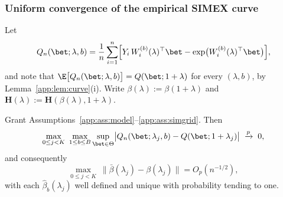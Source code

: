 \subsubsection{Uniform convergence of the empirical SIMEX curve}\label{app:sec:curve}

Let
\[
  Q_n(\bet;\lambda,b)=\frac1n\sum_{i=1}^n
  \Bigl[Y_i\,W_i^{(b)}(\lambda)^\top\bet
  -\exp\bigl(W_i^{(b)}(\lambda)^\top\bet\bigr)\Bigr],
\]
and note that
$\E\bigl[Q_n(\bet;\lambda,b)\bigr]=Q(\bet;1+\lambda)$ for every
$(\lambda,b)$, by Lemma~\ref{app:lem:curve}(i). Write
$\beta(\lambda):=\beta(1+\lambda)$ and
$\bm H(\lambda):=\bm H(\beta(\lambda),1+\lambda)$.

\begin{lemma}
\label{app:lem:unif}
Grant Assumptions~\ref{app:ass:model}--\ref{app:ass:simgrid}. Then
\[
  \max_{0\le j<K}\ \max_{1\le b\le B}
  \sup_{\bet\in\Theta}\bigl|Q_n(\bet;\lambda_j,b)-Q(\bet;1+\lambda_j)\bigr|
  \;\xrightarrow{p}\;0,
\]
and consequently
\[
  \max_{0\le j<K}\ \|\bar\beta(\lambda_j)-\beta(\lambda_j)\|
  =O_p(n^{-1/2}),
\]
with each $\hat\beta_b(\lambda_j)$ well defined and unique with probability
tending to one.
\end{lemma}

